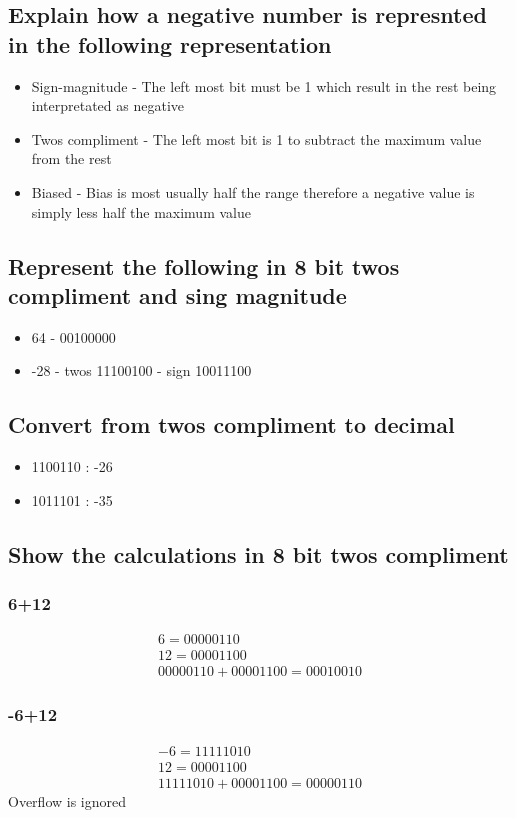 \documentclass[12pt, a4paper]{article}
\begin{document}
		\subsection{Explain how a negative number is represnted in the following representation}
			\begin{itemize}
				\item Sign-magnitude - The left most bit must be 1 which result in the rest being interpretated as negative
				\item Twos compliment - The left most bit is 1 to subtract the maximum value from the rest
				\item Biased - Bias is most usually half the range therefore a negative value is simply less half the maximum value
			\end{itemize}
		\subsection{Represent the following in 8 bit twos compliment and sing magnitude}
			\begin{itemize}
				\item 64 - 00100000
				\item -28 - twos 11100100 - sign 10011100
			\end{itemize}
		\subsection{Convert from twos compliment to decimal}
			\begin{itemize}
				\item 1100110 : -26
				\item 1011101 : -35
			\end{itemize}
		\subsection{Show the calculations in 8 bit twos compliment}
			\subsubsection{6+12}
				\begin{align*}
					6=00000110\\
					12=00001100\\
					00000110+00001100=00010010
				\end{align*}
			\subsubsection{-6+12}
				\begin{align*}
					-6=11111010\\
					12=00001100\\
					11111010+00001100=00000110
				\end{align*}
				Overflow is ignored
\end{document}
